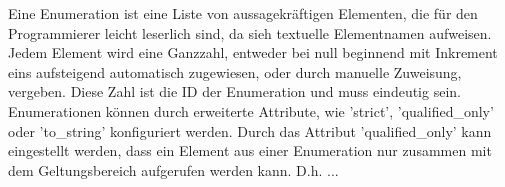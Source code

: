 Eine Enumeration ist eine Liste von aussagekräftigen Elementen, die für den Programmierer leicht leserlich sind, da sieh textuelle Elementnamen aufweisen. Jedem Element wird eine Ganzzahl, entweder  bei null beginnend mit Inkrement eins aufsteigend automatisch zugewiesen, oder durch manuelle Zuweisung, vergeben. Diese Zahl ist die ID der Enumeration und muss eindeutig sein. \\
Enumerationen können durch erweiterte Attribute, wie 'strict', 'qualified\_only' oder 'to\_string' konfiguriert werden. Durch das Attribut 'qualified\_only' kann eingestellt werden, dass ein Element aus einer Enumeration nur zusammen mit dem Geltungsbereich aufgerufen werden kann. D.h. ...



\newpage
